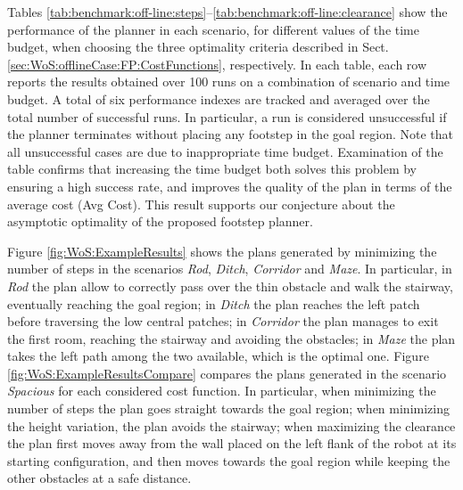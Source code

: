 Tables \ref{tab:benchmark:off-line:steps}--\ref{tab:benchmark:off-line:clearance}
show the performance of the planner in each scenario, for different values of the time budget, when choosing the three optimality criteria described in Sect. \ref{sec:WoS:offlineCase:FP:CostFunctions}, respectively.
In each table, each row reports the results obtained over 100 runs on a combination of scenario and time budget. A total of six performance indexes are tracked and averaged over the total number of successful runs.
In particular, a run is considered unsuccessful if the planner terminates without placing any footstep in the goal region.
Note that all unsuccessful cases are due to inappropriate time budget.
Examination of the table confirms that increasing the time budget both solves this problem by ensuring a high success rate, and improves the quality of the plan in terms of the average cost (Avg Cost). 
This result supports our conjecture about the asymptotic optimality of the proposed footstep planner.

Figure \ref{fig:WoS:ExampleResults} shows the plans generated by minimizing the number of steps in the scenarios \textit{Rod}, \textit{Ditch}, \textit{Corridor} and \textit{Maze}.
In particular, in \textit{Rod} the plan allow to correctly pass over the thin obstacle and walk the stairway, eventually reaching the goal region; in \textit{Ditch} the plan reaches the left patch before traversing the low central patches; in \textit{Corridor} the plan manages to exit the first room, reaching the stairway and avoiding the obstacles; in \textit{Maze} the plan takes the left path among the two available, which is the optimal one. 
Figure \ref{fig:WoS:ExampleResultsCompare} compares the plans generated in the scenario \textit{Spacious} for each considered cost function. 
In particular, when minimizing the number of steps the plan goes straight towards the goal region; when minimizing the height variation, the plan avoids the stairway; when maximizing the clearance the plan first moves away from the wall placed on the left flank of the robot at its starting configuration, and then moves towards the goal region while keeping the other obstacles at a safe distance.

